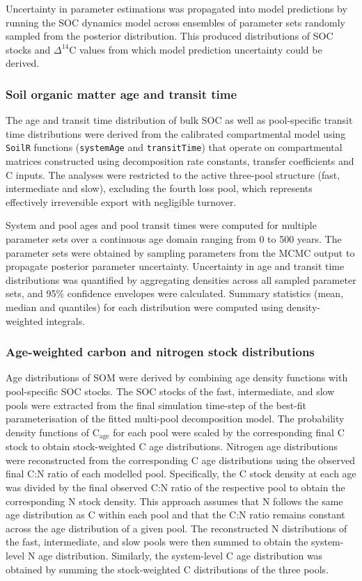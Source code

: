 \documentclass[bg, manuscript]{copernicus}
\begin{document}
Uncertainty in parameter estimations was propagated into model predictions by running the SOC dynamics model across ensembles of parameter sets randomly sampled from the posterior distribution. This produced distributions of SOC stocks and $\Delta^{14}\text{C}$ values from which model prediction uncertainty could be derived.

\subsubsection{Soil organic matter age and transit time}
The age and transit time distribution of bulk SOC as well as pool-specific transit time distributions were derived from the calibrated compartmental model using \texttt{SoilR} functions (\texttt{systemAge} and \texttt{transitTime}) that operate on compartmental matrices constructed using decomposition rate constants, transfer coefficients and C inputs. The analyses were restricted to the active three-pool structure (fast, intermediate and slow), excluding the fourth loss pool, which represents effectively irreversible export with negligible turnover.

System and pool ages and pool transit times were computed for multiple parameter sets over a continuous age domain ranging from 0 to 500 years. The parameter sets were obtained by sampling parameters from the MCMC output to propagate posterior parameter uncertainty. Uncertainty in age and transit time distributions was quantified by aggregating densities across all sampled parameter sets, and 95\% confidence envelopes were calculated. Summary statistics (mean, median and quantiles) for each distribution were computed using density-weighted integrals.

\subsubsection{Age-weighted carbon and nitrogen stock distributions}

Age distributions of SOM were derived by combining age density functions with pool-specific SOC stocks. The SOC stocks of the fast, intermediate, and slow pools were extracted from the final simulation time-step of the best-fit parameterisation of the fitted multi-pool decomposition model. The probability density functions of $\text{C}_{\text{age}}$ for each pool were scaled by the corresponding final C stock to obtain stock-weighted C age distributions.
Nitrogen age distributions were reconstructed from the corresponding C age distributions using the observed final C:N ratio of each modelled pool. Specifically, the C stock density at each age was divided by the final observed C:N ratio of the respective pool to obtain the corresponding N stock density. This approach assumes that N follows the same age distribution as C within each pool and that the C:N ratio remains constant across the age distribution of a given pool. The reconstructed N distributions of the fast, intermediate, and slow pools were then summed to obtain the system-level N age distribution. Similarly, the system-level C age distribution was obtained by summing the stock-weighted C distributions of the three pools.
  
\end{document}
